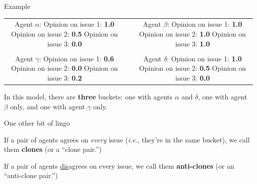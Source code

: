 \documentclass[12pt]{beamer}
\begin{document}
\begin{frame}[c]{Example} %

\begin{center}
\begin{tabular}{cp{1cm}c}
\makecell{
\color{darkgreen} \small Agent $\alpha$: \\
\color{darkgreen} \footnotesize Opinion on issue 1: \textbf{1.0} \\
\color{darkgreen} \footnotesize Opinion on issue 2: \textbf{0.5} \\
\color{darkgreen} \footnotesize Opinion on issue 3: \textbf{0.0} \\
} & &
\makecell{
\color{red} \small Agent $\beta$: \\
\color{red} \footnotesize Opinion on issue 1: \textbf{1.0} \\
\color{red} \footnotesize Opinion on issue 2: \textbf{1.0} \\
\color{red} \footnotesize Opinion on issue 3: \textbf{1.0} \\
} \\
\smallskip \\
\makecell{
\color{blue} \small Agent $\gamma$: \\
\color{blue} \footnotesize Opinion on issue 1: \textbf{0.6} \\
\color{blue} \footnotesize Opinion on issue 2: \textbf{0.0} \\
\color{blue} \footnotesize Opinion on issue 3: \textbf{0.2} \\
} & &
\makecell{
\color{darkgreen} \small Agent $\delta$: \\
\color{darkgreen} \footnotesize Opinion on issue 1: \textbf{1.0} \\
\color{darkgreen} \footnotesize Opinion on issue 2: \textbf{0.5} \\
\color{darkgreen} \footnotesize Opinion on issue 3: \textbf{0.0} \\
} \\
\end{tabular}

\bigskip
{In this model, there are \textbf{three} buckets: one with agents
$\alpha$ and $\delta$, one with agent $\beta$ only, and one with agent $\gamma$
only.}
\end{center}
\end{frame}


\begin{frame}[c]{One other bit of lingo} %

If a pair of agents agrees on \textit{every} issue (\textit{i.e.}, they're in
the same bucket), we call them \textbf{clones} (or a ``clone pair.'')

\bigskip

If a pair of agents \underline{dis}agrees on every issue, we call them
\textbf{anti-clones} (or an ``anti-clone pair.'')

\end{frame}
\end{document}
